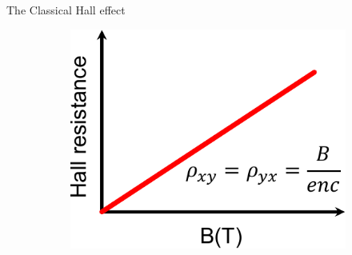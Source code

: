 \documentclass[aspectratio=169,compress,x11names]{beamer}
\begin{document}
\begin{frame}{The Classical Hall effect}
\begin{figure}
\begin{subfigure}[b]{0.4\textwidth}
			\end{subfigure}
			\hspace{-3\baselineskip}
			\begin{subfigure}[b]{0.4\textwidth}
				\centering
				\includegraphics[width=0.6\linewidth]{../pic/HallRess.pdf}
			\end{subfigure}
		\end{figure}
	\end{frame}
\end{document}
